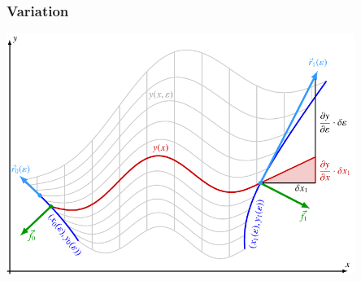 %
%
%
\bgroup
\begin{frame}[t]
\setlength{\abovedisplayskip}{5pt}
\setlength{\belowdisplayskip}{5pt}
\frametitle{Variation}
\vspace{-11pt}
\begin{center}
\includegraphics[width=0.85\textwidth]{../../buch/chapters/020-variation/images/variation.pdf}
\end{center}
\end{frame}
\egroup
